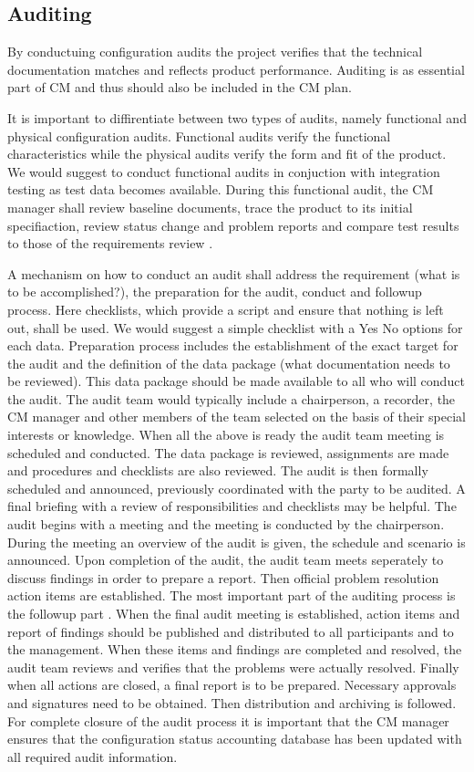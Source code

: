 \documentclass[a4paper]{article}
\begin{document}
\subsection{Auditing}

By conductuing configuration audits the project verifies that the technical documentation matches and reflects product performance. Auditing is as essential part of CM and thus should also be included in the CM plan.

It is important to diffirentiate between two types of audits, namely functional and physical configuration audits. Functional audits verify the functional characteristics while the physical audits verify the form and fit of the product. We would suggest to conduct functional audits in conjuction with integration testing as test data becomes available. During this functional audit, the CM manager shall review baseline documents, trace the product to its initial specifiaction, review status change and problem reports and compare test results to those of the requirements review \cite{daniels}. 

 A mechanism on how to conduct an audit shall address the requirement (what is to be accomplished?), the preparation for the audit, conduct and followup process. Here checklists, which provide a script and ensure that nothing is left out, shall be used. We would suggest a simple checklist with a Yes No options for each data. Preparation process includes the establishment of the exact target for the audit and the definition of the data package (what documentation needs to be reviewed). This data package should be made available to all who will conduct the audit. The audit team would typically include a chairperson, a recorder, the CM manager and other members of the team selected on the basis of their special interests or knowledge. When all the above is ready the audit team meeting is scheduled and conducted. The data package is reviewed, assignments are made and procedures and checklists are also reviewed. The audit is then formally scheduled and announced, previously coordinated with the party to be audited. A final briefing with a review of responsibilities and checklists may be helpful. The audit begins with a meeting and the meeting is conducted by the chairperson. During the meeting an overview of the audit is given, the schedule and scenario is announced. Upon completion of the audit, the audit team meets seperately to discuss findings in order to prepare a report. Then official problem resolution action items are established. The most important part of the auditing process is the followup part \cite{daniels}. When the final audit meeting is established, action items and report of findings should be published and distributed to all participants and to the management. When these items and findings are completed and resolved, the audit team reviews and verifies that the problems were actually resolved. Finally when all actions are closed, a final report is to be prepared. Necessary approvals and signatures need to be obtained. Then distribution and archiving is followed. For complete closure of the audit process it is important that the CM manager ensures that the configuration status accounting database has been updated with all required audit information.
\end{document}
